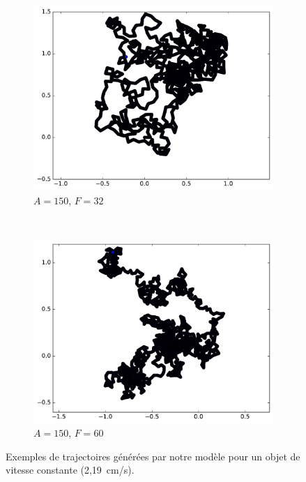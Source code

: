 \begin{figure}[htb]
\begin{subfigure}[t]{\subImgWmo}
			\includegraphics[width=\textwidth]{figures/ch3/synTraj_219_150_32}
			\caption[$A = 150$, $F=32$]{$A = 150$, $F=32$}
			\label{fig:synTraj_219_150_32}
		\end{subfigure}
		~
		\begin{subfigure}[t]{\subImgWmo}
			\centering
			\includegraphics[width=\textwidth]{figures/ch3/synTraj_219_150_60}
			\caption[$A = 150$, $F=60$]{$A = 150$, $F=60$}
			\label{fig:synTraj_219_150_60}
		\end{subfigure}
		\caption[Mouvements générés par notre modèle -- V]{Exemples de trajectoires générées par notre modèle pour un objet de vitesse constante (2,19~cm/s).}
		\label{fig:motion135150}
	\end{figure}
	
